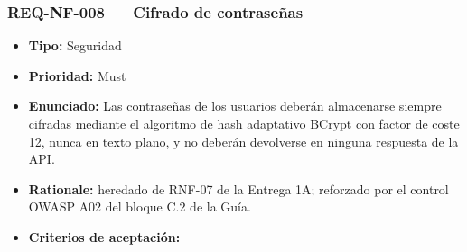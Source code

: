 \documentclass[
  spanish,
]{article}
\providecommand{\tightlist}{%
  \setlength{\itemsep}{0pt}\setlength{\parskip}{0pt}}
\begin{document}
\subsubsection{REQ-NF-008 --- Cifrado de
contraseñas}\label{req-nf-008-cifrado-de-contraseuxf1as}

\begin{itemize}
\tightlist
\item
  \textbf{Tipo:} Seguridad
\item
  \textbf{Prioridad:} Must
\item
  \textbf{Enunciado:} Las contraseñas de los usuarios deberán
  almacenarse siempre cifradas mediante el algoritmo de hash adaptativo
  BCrypt con factor de coste 12, nunca en texto plano, y no deberán
  devolverse en ninguna respuesta de la API.
\item
  \textbf{Rationale:} heredado de RNF-07 de la Entrega 1A; reforzado por
  el control OWASP A02 del bloque C.2 de la Guía.
\item
  \textbf{Criterios de aceptación:}


\end{itemize}
\end{document}
